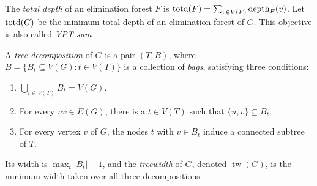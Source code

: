 The \emph{total depth} of an elimination forest $F$ is
$\operatorname{totd}(F)=\sum_{v\in V(F)}\operatorname{depth}_F(v)$.
Let $\operatorname{totd}(G)$ be the minimum total depth of an
elimination forest of $G$. This objective is also called
\emph{VPT-sum}~\cite{HogemoEtAl2021}.

A \emph{tree decomposition} of $G$ is a pair $(T,B)$, where $B=\{B_t\subseteq V(G):t\in V(T)\}$ is a collection of \emph{bags}, satisfying three conditions:
\begin{enumerate}
\item $\displaystyle\bigcup_{t\in V(T)} B_t=V(G)$.
\item For every $uv\in E(G)$, there is a $t\in V(T)$ such that
$\{u,v\}\subseteq B_t$.
\item For every vertex $v$ of $G$, the nodes $t$ with $v\in B_t$
induce a connected subtree of $T$.
\end{enumerate}
Its width is
$\max_t|B_t|-1$, and the \emph{treewidth} of $G$, denoted $\operatorname{tw}(G)$, is
the minimum width taken over all three decompositions.

